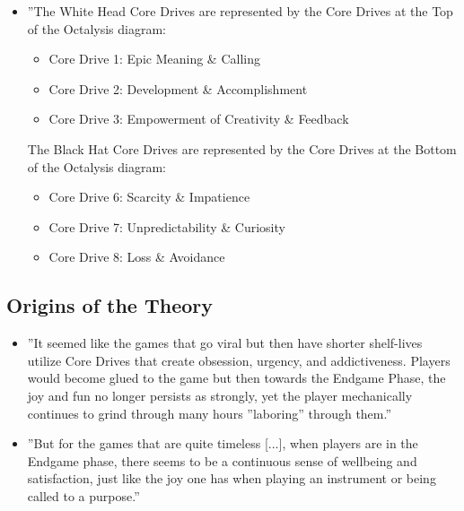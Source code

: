 \begin{itemize}
    \item ''The White Head Core Drives are represented by the Core Drives at the Top of the Octalysis diagram:
    \begin{itemize}
        \item Core Drive 1: Epic Meaning \& Calling
        \item Core Drive 2: Development \& Accomplishment
        \item Core Drive 3: Empowerment of Creativity \& Feedback
    \end{itemize}
    The Black Hat Core Drives are represented by the Core Drives at the Bottom of the Octalysis diagram:
    \begin{itemize}
        \item Core Drive 6: Scarcity \& Impatience
        \item Core Drive 7: Unpredictability \& Curiosity
        \item Core Drive 8: Loss \& Avoidance
    \end{itemize}
\end{itemize}

\subsection{Origins of the Theory}
\begin{itemize}
    \item ''It seemed like the games that go viral but then have shorter shelf-lives utilize Core Drives that create obsession, urgency, and addictiveness. Players would become glued to the game but then towards the Endgame Phase, the joy and fun no longer persists as strongly, yet the player mechanically continues to grind through many hours ''laboring'' through them.''
    \item ''But for the games that are quite timeless [...], when players are in the Endgame phase, there seems to be a continuous sense of wellbeing and satisfaction, just like the joy one has when playing an instrument or being called to a purpose.''
\end{itemize}


